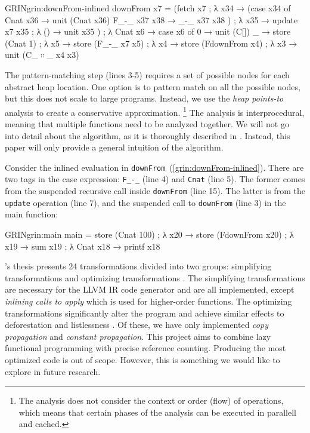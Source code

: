 \documentclass[9pt, twocolumn]{article}
\newcommand{\refp}[1]{(\ref{#1})}
\begin{document}
\begin{typewriter}[left]{GRIN}{grin:downFrom-inlined}
downFrom x7 =
  (fetch x7 ; λ x34 →
   (case x34 of
      Cnat x36 → unit (Cnat x36)
      F_-_ x37 x38 → _-_ x37 x38
   ) ; λ x35 →
   update x7 x35 ; λ () →
   unit x35
  ) ; λ Cnat x6 →
  case x6 of
    0 → unit (C[])
    _ →
      store (Cnat 1) ; λ x5 →
      store (F_-_ x7 x5) ; λ x4 →
      store (FdownFrom x4) ; λ x3 →
      unit (C_$∷$_ x4 x3)
\end{typewriter}
The pattern-matching step (lines 3-5) requires a set of possible nodes for each abstract heap location.
One option is to pattern match on all the possible nodes, but this does not scale to large programs.
Instead, we use the \emph{heap points-to} analysis \citep{johnsson1991} to create a conservative approximation.%
\footnote{%
The analysis does not consider the context or order (flow) of operations, which means that certain phases of the analysis can be executed in parallell and cached. 

}
The analysis is interprocedural, meaning that multiple functions need to be analyzed together.
We will not go into detail about the algorithm, as it is thoroughly described in \citep{boquist1996, johnsson1991}. 
Instead, this paper will only provide a general intuition of the algorithm.

Consider the inlined evaluation in \mbox{\lstinline{downFrom} \refp{grin:downFrom-inlined}}.
There are two tags in the case expression: \lstinline{F_-_} (line 4) and \lstinline{Cnat} (line 5). 
The former comes from the suspended recursive call inside \lstinline{downFrom} (line 15). 
The latter is from the \lstinline{update} operation (line 7), and the suspended call to \lstinline{downFrom} (line 3) in the main function:

\begin{typewriter}[left]{GRIN}{grin:main}
main =
  store (Cnat 100) ; λ x20 →
  store (FdownFrom x20) ; λ x19 →
  sum x19 ; λ Cnat x18 →
  printf x18
\end{typewriter}

\citeauthor{boquist1999}'s thesis presents 24 transformations divided into two groups: simplifying transformations and optimizing 
transformations \citep{boquist1999}. 
The simplifying transformations are necessary for the LLVM IR code generator and are all implemented, except \emph{inlining calls to apply}
which is used for higher-order functions. 
The optimizing transformations significantly alter the program and achieve similar effects to deforestation \citep{wadler1988} and listlessness \citep{wadler1984}.
Of these, we have only implemented \emph{copy propagation} and \emph{constant propagation}.
This project aims to combine lazy functional programming with precise reference counting. 
Producing the most optimized code is out of scope. 
However, this is something we would like to explore in future research.
\end{document}
